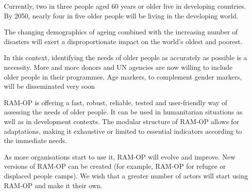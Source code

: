 \documentclass[12pt,a4paper]{book}
\begin{document}
Currently, two in three people aged 60 years or older live in developing countries. By 2050, nearly four in five older people will be living in the developing world.

The changing demographics of ageing combined with the increasing number of disasters will exert a disproportionate impact on the world's oldest and poorest.

In this context, identifying the needs of older people as accurately as possible is a necessity. More and more donors and UN agencies are now willing to include older people in their programmes. Age markers, to complement gender markers, will be disseminated very soon

RAM-OP is offering a fast, robust, reliable, tested and user-friendly way of assessing the needs of older people. It can be used in humanitarian situations as well as in development contexts. The modular structure of RAM-OP allows for adaptations, making it exhaustive or limited to essential indicators according to the immediate needs.

As more organisations start to use it, RAM-OP will evolve and improve. New versions of RAM-OP can be created (for example, RAM-OP for refugee or displaced people camps). We wish that a greater number of actors will start using RAM-OP and make it their own.


\end{document}
